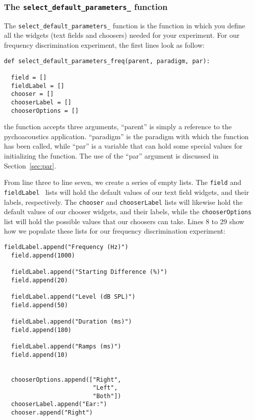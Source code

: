 \subsubsection{The \texttt{select\_default\_parameters\_} function}
The \texttt{select\_default\_parameters\_} function is the function in which you
define all the widgets (text fields and choosers) needed for your experiment.
For our frequency discrimination experiment, the first lines look as follow:
\begin{lstlisting}
def select_default_parameters_freq(parent, paradigm, par):
   
  field = []
  fieldLabel = []
  chooser = []
  chooserLabel = []
  chooserOptions = []
\end{lstlisting}
the function accepts three arguments, ``parent'' is simply a reference to the pychoacoustics
application. ``paradigm'' is the paradigm with which the
function has been called, while ``par'' is a variable
that can hold some special values for initializing the function. The use of the ``par'' argument is discussed in Section~\ref{sec:par}.

From line three to line seven, we create a series of empty lists. The \texttt{field} and \texttt{fieldLabel } lists will
hold the default values of our text field widgets, and their labels, respectively. The \texttt{chooser} and \texttt{chooserLabel}
lists will likewise hold the default values of our chooser widgets, and their labels, while the \texttt{chooserOptions} list will hold 
the possible values that our choosers can take. Lines 8 to 29 show how we populate these lists for our frequency discrimination
experiment:

\begin{lstlisting}[firstnumber=8]
  fieldLabel.append("Frequency (Hz)")
  field.append(1000)

  fieldLabel.append("Starting Difference (%)")
  field.append(20)
    
  fieldLabel.append("Level (dB SPL)")
  field.append(50)
   
  fieldLabel.append("Duration (ms)")
  field.append(180)
    
  fieldLabel.append("Ramps (ms)")
  field.append(10)

    
  chooserOptions.append(["Right",
                         "Left",
                         "Both"])
  chooserLabel.append("Ear:")
  chooser.append("Right")
\end{lstlisting}

